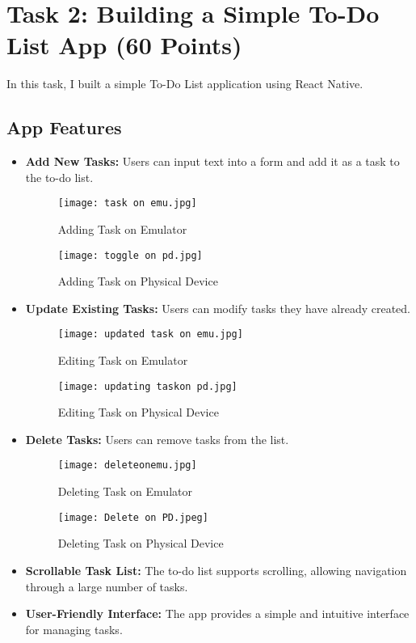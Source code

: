 \documentclass{article}
\begin{document}
\section{Task 2: Building a Simple To-Do List App (60 Points)}
In this task, I built a simple To-Do List application using React Native.

\subsection{App Features}
\begin{itemize}
    \item \textbf{Add New Tasks:} Users can input text into a form and add it as a task to the to-do list.
    \begin{figure}[H]
        \centering
        \texttt{[image: task on emu.jpg]}
        \caption{Adding Task on Emulator}
    \end{figure}
    \begin{figure}[H]
        \centering
        \texttt{[image: toggle on pd.jpg]}
        \caption{Adding Task on Physical Device}
    \end{figure}

    \item \textbf{Update Existing Tasks:} Users can modify tasks they have already created.
    \begin{figure}[H]
        \centering
        \texttt{[image: updated task on emu.jpg]}
        \caption{Editing Task on Emulator}
    \end{figure}
    \begin{figure}[H]
        \centering
        \texttt{[image: updating taskon pd.jpg]}
        \caption{Editing Task on Physical Device}
    \end{figure}
    
    \item \textbf{Delete Tasks:} Users can remove tasks from the list.
    \begin{figure}[H]
        \centering
        \texttt{[image: deleteonemu.jpg]}
        \caption{Deleting Task on Emulator}
    \end{figure}
    \begin{figure}[H]
        \centering
        \texttt{[image: Delete on PD.jpeg]}
        \caption{Deleting Task on Physical Device}
    \end{figure}
    
    \item \textbf{Scrollable Task List:} The to-do list supports scrolling, allowing navigation through a large number of tasks.

    \item \textbf{User-Friendly Interface:} The app provides a simple and intuitive interface for managing tasks.
\end{itemize}
\end{document}
